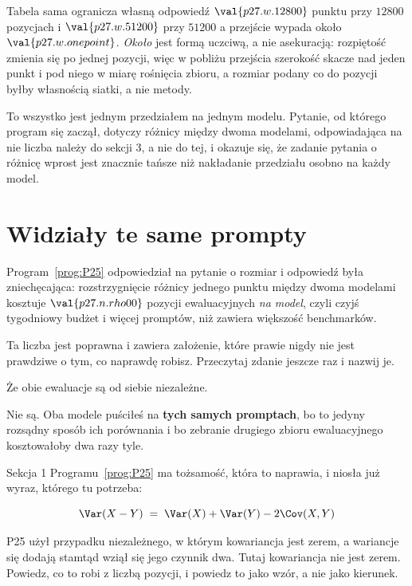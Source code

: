 \begin{fr}
Tabela sama ogranicza własną odpowiedź \dash{} $\val{p27.w.12800}$ punktu
przy $\num{12800}$ pozycjach i $\val{p27.w.51200}$ przy $\num{51200}$
\dash{} a przejście wypada około $\val{p27.w.onepoint}$. \emph{Około} jest
formą uczciwą, a nie asekuracją: rozpiętość zmienia się po jednej pozycji,
więc w pobliżu przejścia szerokość skacze nad jeden punkt i pod niego w miarę
rośnięcia zbioru, a rozmiar podany co do pozycji byłby własnością siatki, a
nie metody.

To wszystko jest jednym przedziałem na jednym modelu. Pytanie, od którego
program się zaczął, dotyczy różnicy między dwoma modelami, odpowiadająca na
nie liczba należy do sekcji 3, a nie do tej, i okazuje się, że zadanie
pytania o różnicę wprost jest znacznie tańsze niż nakładanie przedziału
osobno na każdy model.
\end{fr}

\section{Widziały te same prompty}
\label{sec:P27-paired}

\begin{fr}
Program~\ref{prog:P25} odpowiedział na pytanie o rozmiar i odpowiedź była
zniechęcająca: rozstrzygnięcie różnicy jednego punktu między dwoma modelami
kosztuje $\val{p27.n.rho00}$ pozycji ewaluacyjnych \emph{na model}, czyli
czyjś tygodniowy budżet i więcej promptów, niż zawiera większość benchmarków.

Ta liczba jest poprawna i zawiera założenie, które prawie nigdy nie jest
prawdziwe o tym, co naprawdę robisz. Przeczytaj zdanie jeszcze raz i nazwij
je.
\dotline
\nextframe
\end{fr}

\begin{fr}
\begin{ansblock}
Że obie ewaluacje są od siebie niezależne.
\end{ansblock}

Nie są. Oba modele puściłeś na \textbf{tych samych promptach}, bo to jedyny
rozsądny sposób ich porównania i bo zebranie drugiego zbioru ewaluacyjnego
kosztowałoby dwa razy tyle.

Sekcja 1 Programu~\ref{prog:P25} ma tożsamość, która to naprawia, i niosła już
wyraz, którego tu potrzeba:

\[ \Var(X - Y) \;=\; \Var(X) + \Var(Y) - 2\Cov(X, Y) \]

P25 użył przypadku niezależnego, w którym kowariancja jest zerem, a wariancje
się dodają \dash{} stamtąd wziął się jego czynnik dwa. Tutaj kowariancja nie
jest zerem. Powiedz, co to robi z liczbą pozycji, i powiedz to jako wzór, a
nie jako kierunek.
\dotline
\nextframe
\end{fr}

